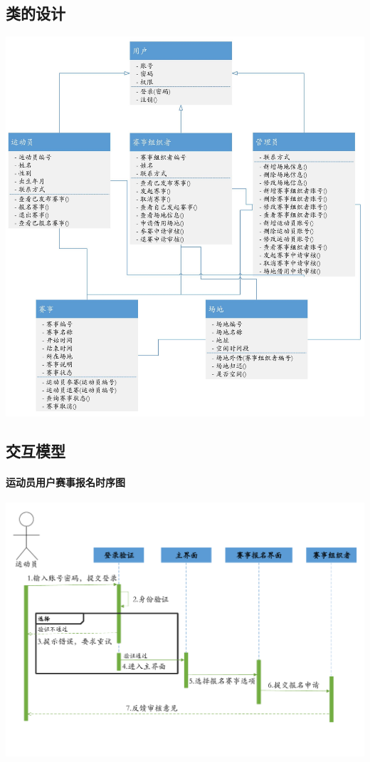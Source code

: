 \documentclass[a4paper,UTF8]{article}
\begin{document}
\subsection{类的设计}
{\centering\includegraphics[width=1\columnwidth]{class.jpg}
	
}

\subsection{交互模型}

\paragraph{运动员用户赛事报名时序图}
{\centering\includegraphics[width=1\columnwidth]{sd1}
	
}
\end{document}
